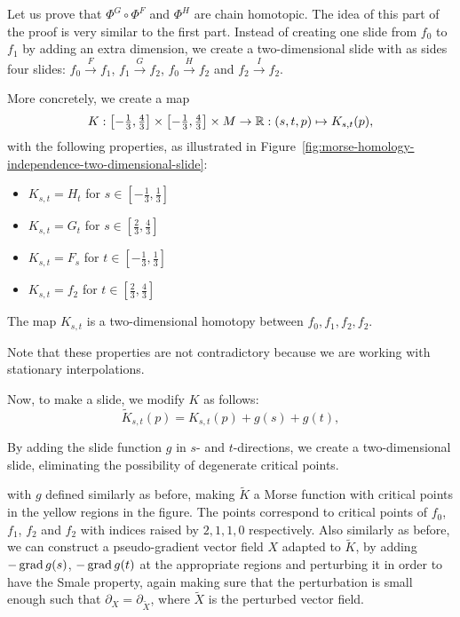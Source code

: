 \begin{myproof}
Let us prove that $\Phi^{G}  \circ  \Phi^{F}$ and $\Phi^{H}$ are chain homotopic.
The idea of this part of the proof is very similar to the first part.
Instead of creating one slide from $f_0$ to $f_1$ by adding an extra dimension, we create a two-dimensional slide with as sides four slides: $f_0 \xrightarrow{F} f_1$, $ f_1 \xrightarrow{G} f_2$, $f_0 \xrightarrow{H}  f_2$ and $ f_2 \xrightarrow{I} f_2$.


More concretely, we create a map
\[
    K: \left[-\tfrac{1}{3}, \tfrac{4}{3}\right] \times \left[-\tfrac{1}{3}, \tfrac{4}{3}\right] \times M \to  \mathbb{R}:  (s, t, p) \mapsto K_{s, t}(p)
,\] 
with the following properties, as illustrated in Figure~\ref{fig:morse-homology-independence-two-dimensional-slide}:
\begin{itemize}
    \item $K_{s,t} = H_t$ for  $s \in \left[-\tfrac{1}{3}, \tfrac{1}{3}\right]$
    \item $K_{s,t} = G_t$ for  $s \in \left[\tfrac{2}{3}, \tfrac{4}{3}\right]$
        \item $K_{s, t} = F_s$ for $t \in \left[-\tfrac{1}{3}, \tfrac{1}{3}\right]$ 
        \item $K_{s,t} = f_2$ for $t \in \left[\tfrac{2}{3}, \tfrac{4}{3}\right]$
\end{itemize}
\begin{marginfigure}
    \centering
    \caption{The map $K_{s,t}$ is a two-dimensional homotopy between $f_0, f_1, f_2, f_2$.}
    \label{fig:morse-homology-independence-two-dimensional-slide}
\end{marginfigure}
Note that these properties are not contradictory because we are working with stationary interpolations.

Now, to make a slide, we modify $K$ as follows:
 \[
     \tilde{K}_{s,t}(p) = K_{s,t}(p) + g(s) + g(t)
,\] 

\begin{marginfigure}
    \centering
    \caption{By adding the slide function $g$ in $s$- and $t$-directions, we create a two-dimensional slide, eliminating the possibility of degenerate critical points.}
    \label{fig:morse-homology-independence-two-dimensional-slide-three-d}
\end{marginfigure}

with $g$ defined similarly as before, making $\tilde{K}$ a Morse function with critical points in the yellow regions in the figure.
The points correspond to critical points of $f_0$, $f_1$, $f_2$ and $f_2$ with indices raised by $2, 1, 1, 0$ respectively.
Also similarly as before, we can construct a pseudo-gradient vector field $X$ adapted to $\tilde{K}$, by adding $-\operatorname{grad} g(s)$, $-\operatorname{grad} g(t)$ at the appropriate regions and perturbing it in order to have the Smale property, again making sure that the perturbation is small enough such that $\partial_X = \partial_{\tilde X}$, where $\tilde{X}$ is the perturbed vector field.


\end{myproof}
